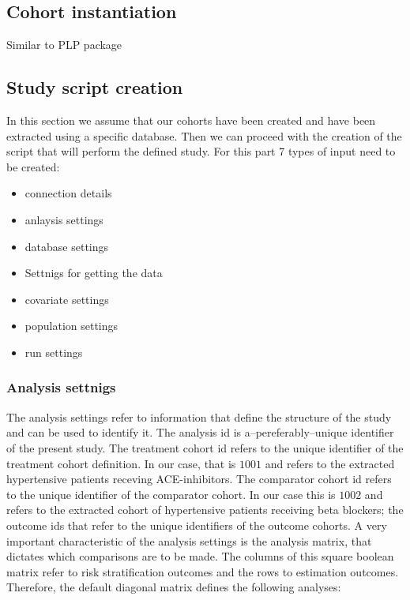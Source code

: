 \documentclass[]{article}
\providecommand{\tightlist}{%
  \setlength{\itemsep}{0pt}\setlength{\parskip}{0pt}}
\begin{document}
\hypertarget{cohort-instantiation}{%
\subsection{Cohort instantiation}\label{cohort-instantiation}}

Similar to PLP package

\hypertarget{study-script-creation}{%
\subsection{Study script creation}\label{study-script-creation}}

In this section we assume that our cohorts have been created and have
been extracted using a specific database. Then we can proceed with the
creation of the script that will perform the defined study. For this
part 7 types of input need to be created:

\begin{itemize}
\tightlist
\item
  connection details
\item
  anlaysis settings
\item
  database settings
\item
  Settnigs for getting the data
\item
  covariate settings
\item
  population settings
\item
  run settings
\end{itemize}

\hypertarget{analysis-settnigs}{%
\subsubsection{Analysis settnigs}\label{analysis-settnigs}}

The analysis settings refer to information that define the structure of
the study and can be used to identify it. The analysis id is
a--pereferably--unique identifier of the present study. The treatment
cohort id refers to the unique identifier of the treatment cohort
definition. In our case, that is \(1001\) and refers to the extracted
hypertensive patients receving ACE-inhibitors. The comparator cohort id
refers to the unique identifier of the comparator cohort. In our case
this is \(1002\) and refers to the extracted cohort of hypertensive
patients receiving beta blockers; the outcome ids that refer to the
unique identifiers of the outcome cohorts. A very important
characteristic of the analysis settings is the analysis matrix, that
dictates which comparisons are to be made. The columns of this square
boolean matrix refer to risk stratification outcomes and the rows to
estimation outcomes. Therefore, the default diagonal matrix defines the
following analyses:
\end{document}
